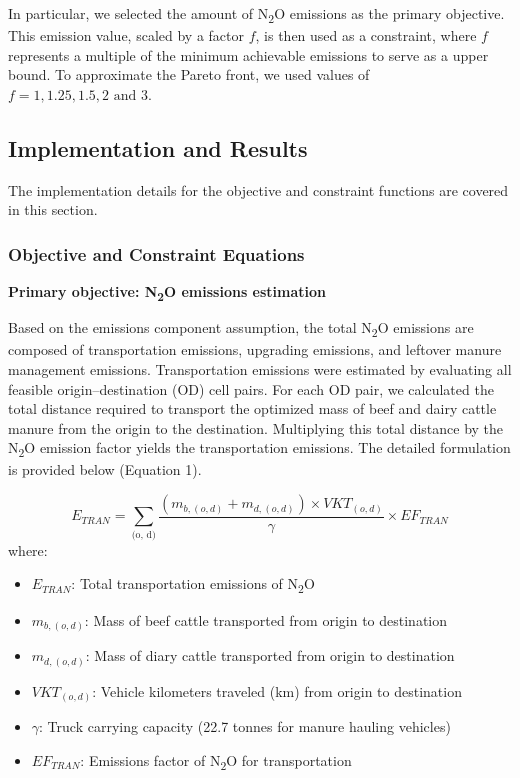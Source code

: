 \documentclass[12pt]{article}
\begin{document}
In particular, we selected the amount of N\textsubscript{2}O emissions as the primary objective. This emission value, scaled by a factor $f$, is then used as a constraint, where $f$ represents a multiple of the minimum achievable emissions to serve as a upper bound. To approximate the Pareto front, we used values of $f=1, 1.25, 1.5, 2 \text{ and } 3$.

\subsection{Implementation and Results}
The implementation details for the objective and constraint functions are covered in this section.

\subsubsection{Objective and Constraint Equations}

\textbf{Primary objective: N\textsubscript{2}O emissions estimation}

Based on the emissions component assumption, the total N\textsubscript{2}O emissions are composed of transportation emissions, upgrading emissions, and leftover manure management emissions. Transportation emissions were estimated by evaluating all feasible origin–destination (OD) cell pairs. For each OD pair, we calculated the total distance required to transport the optimized mass of beef and dairy cattle manure from the origin to the destination. Multiplying this total distance by the N\textsubscript{2}O emission factor yields the transportation emissions. The detailed formulation is provided below (Equation 1).

\begin{equation}
  E_{TRAN} = \sum_{\text{(o, d)}}\frac{(m_{b, (o, d)} + m_{d, (o, d)}) \times VKT_{(o, d)}}{\gamma} \times EF_{TRAN}
\end{equation}
where:
\begin{itemize}
  \item $E_{TRAN}$: Total transportation emissions of N\textsubscript{2}O
  \item $m_{b, (o, d)}$: Mass of beef cattle transported from origin to destination
  \item $m_{d, (o, d)}$: Mass of diary cattle transported from origin to destination
  \item $VKT_{(o, d)}$: Vehicle kilometers traveled (km) from origin to destination
  \item $\gamma$: Truck carrying capacity (22.7 tonnes for manure hauling vehicles)
  \item $EF_{TRAN}$: Emissions factor of N\textsubscript{2}O for transportation
\end{itemize}
\end{document}
